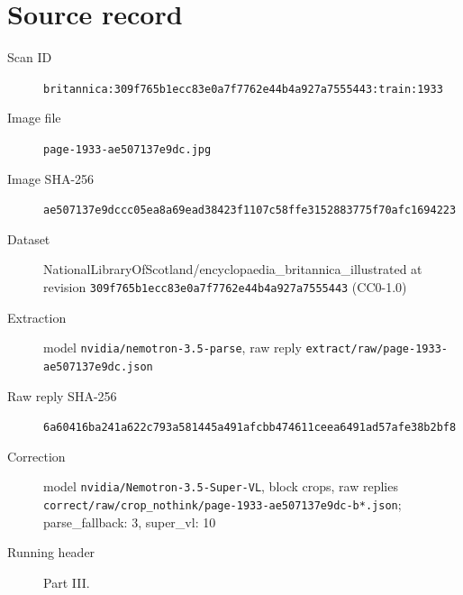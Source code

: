 \documentclass{article}
\begin{document}
\section*{Source record}
\begin{description}
\item[Scan ID] \texttt{britannica:309f765b1ecc83e0a7f7762e44b4a927a7555443:train:1933}
\item[Image file] \texttt{page-1933-ae507137e9dc.jpg}
\item[Image SHA-256] \texttt{ae507137e9dccc05ea8a69ead38423f1107c58ffe3152883775f70afc1694223}
\item[Dataset] NationalLibraryOfScotland/encyclopaedia\_britannica\_illustrated at revision \texttt{309f765b1ecc83e0a7f7762e44b4a927a7555443} (CC0-1.0)
\item[Extraction] model \texttt{nvidia/nemotron-3.5-parse}, raw reply \texttt{extract/raw/page-1933-ae507137e9dc.json}
\item[Raw reply SHA-256] \texttt{6a60416ba241a622c793a581445a491afcbb474611ceea6491ad57afe38b2bf8}
\item[Correction] model \texttt{nvidia/Nemotron-3.5-Super-VL}, block crops, raw replies \texttt{correct/raw/crop\_nothink/page-1933-ae507137e9dc-b*.json}; parse\_fallback: 3, super\_vl: 10
\item[Running header] Part III.
\end{description}
\end{document}
